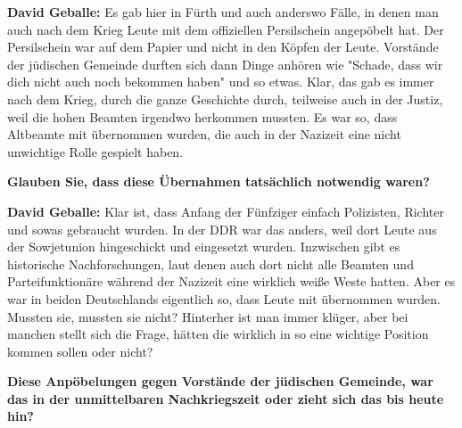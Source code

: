 \textbf{David Geballe:} Es gab hier in Fürth und auch anderswo Fälle, in denen man auch nach dem Krieg Leute mit dem offiziellen Persilschein angepöbelt hat. Der Persilschein war auf dem Papier und nicht in den Köpfen der Leute. Vorstände der jüdischen Gemeinde durften sich dann Dinge anhören wie "Schade, dass wir dich nicht auch noch bekommen haben" und so etwas. Klar, das gab es immer nach dem Krieg, durch die ganze Geschichte durch, teilweise auch in der Justiz, weil die hohen Beamten irgendwo herkommen mussten. Es war so, dass Altbeamte mit übernommen wurden, die auch in der Nazizeit eine nicht unwichtige Rolle gespielt haben. 

\textbf{Glauben Sie, dass diese Übernahmen tatsächlich notwendig waren?} 

\textbf{David Geballe:} Klar ist, dass Anfang der Fünfziger einfach Polizisten, Richter und sowas gebraucht wurden. In der DDR war das anders, weil dort Leute aus der Sowjetunion hingeschickt und eingesetzt wurden. Inzwischen gibt es historische Nachforschungen, laut denen auch dort nicht alle Beamten und Parteifunktionäre während der Nazizeit eine wirklich weiße Weste hatten. Aber es war in beiden Deutschlands eigentlich so, dass Leute mit übernommen wurden. Mussten sie, mussten sie nicht? Hinterher ist man immer klüger, aber bei manchen stellt sich die Frage, hätten die wirklich in so eine wichtige Position kommen sollen oder nicht? 

\textbf{Diese Anpöbelungen gegen Vorstände der jüdischen Gemeinde, war das in der unmittelbaren Nachkriegszeit oder zieht sich das bis heute hin?} 

